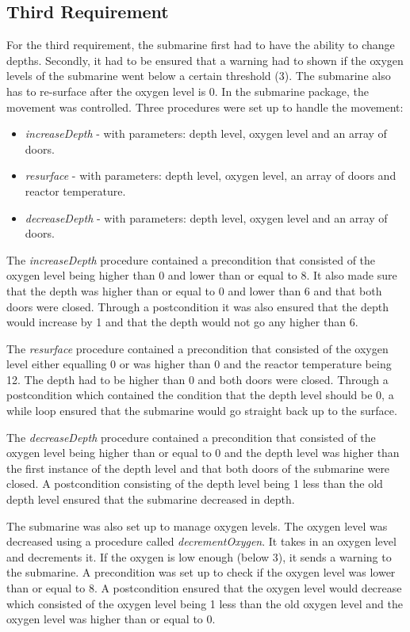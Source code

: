 \subsection{Third Requirement}
For the third requirement, the submarine first had to have the ability to change depths. Secondly, it had to be ensured that a warning had to shown if the oxygen levels of the submarine went below a certain threshold (3). The submarine also has to re-surface after the oxygen level is 0. In the submarine package, the movement was controlled. Three procedures were set up to handle the movement:

\begin{itemize}
	\item \textit{increaseDepth} - with parameters: depth level, oxygen level and an array of doors.
	\item \textit{resurface} - with parameters: depth level, oxygen level, an array of doors and reactor temperature.
	\item \textit{decreaseDepth} - with parameters: depth level, oxygen level and an array of doors.
\end{itemize}

The \textit{increaseDepth} procedure contained a precondition that consisted of the oxygen level being higher than 0 and lower than or equal to 8. It also made sure that the depth was higher than or equal to 0 and lower than 6 and that both doors were closed. Through a postcondition it was also ensured that the depth would increase by 1 and that the depth would not go any higher than 6.

The \textit{resurface} procedure contained a precondition that consisted of the oxygen level either equalling 0 or was higher than 0 and the reactor temperature being 12. The depth had to be higher than 0 and both doors were closed. Through a postcondition which contained the condition that the depth level should be 0, a while loop ensured that the submarine would go straight back up to the surface.

The \textit{decreaseDepth} procedure contained a precondition that consisted of the oxygen level being higher than or equal to 0 and the depth level was higher than the first instance of the depth level and that both doors of the submarine were closed. A postcondition consisting of the depth level being 1 less than the old depth level ensured that the submarine decreased in depth. 

The submarine was also set up to manage oxygen levels. The oxygen level was decreased using a procedure called \textit{decrementOxygen}. It takes in an oxygen level and decrements it. If the oxygen is low enough (below 3), it sends a warning to the submarine. A precondition was set up to check if the oxygen level was lower than or equal to 8. A postcondition ensured that the oxygen level would decrease which consisted of the oxygen level being 1 less than the old oxygen level and the oxygen level was higher than or equal to 0.


